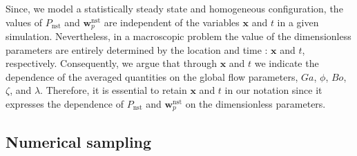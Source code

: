 Since, we model a statistically steady state and homogeneous configuration, the values of $P_\text{nst}$ and $\textbf{w}^\text{nst}_p$ are independent of the variables $\mathbf{x}$ and $t$ in a given simulation. 
Nevertheless, in a macroscopic problem the value of the dimensionless parameters are entirely determined by the location and time : $\textbf{x}$ and $t$, respectively. 
Consequently, we argue that through $\mathbf{x}$ and $t$ we indicate the dependence of the averaged quantities on the global flow parameters, $Ga$, $\phi$, $Bo$, $\zeta$, and $\lambda$.
Therefore, it is essential to retain $\mathbf{x}$ and $t$ in our notation since it expresses the dependence of $P_\text{nst}$ and $\textbf{w}^\text{nst}_p$ on the dimensionless parameters. 



\subsection{Numerical sampling}


